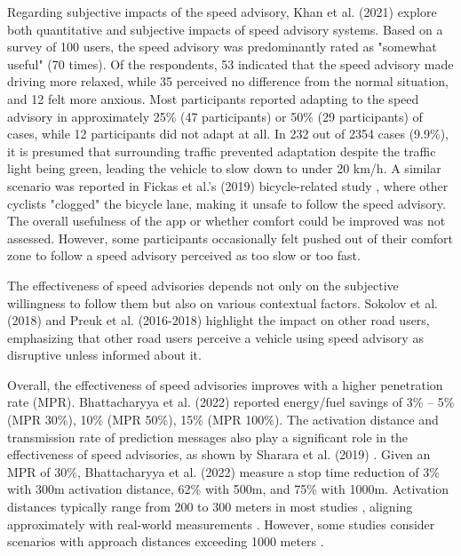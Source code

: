Regarding subjective impacts of the speed advisory, Khan et al. (2021) \cite{khan_eco-drive_2021} explore both quantitative and subjective impacts of speed advisory systems. Based on a survey of 100 users, the speed advisory was predominantly rated as "somewhat useful" (70 times). Of the respondents, 53 indicated that the speed advisory made driving more relaxed, while 35 perceived no difference from the normal situation, and 12 felt more anxious. Most participants reported adapting to the speed advisory in approximately 25\% (47 participants) or 50\% (29 participants) of cases, while 12 participants did not adapt at all. In 232 out of 2354 cases (9.9\%), it is presumed that surrounding traffic prevented adaptation despite the traffic light being green, leading the vehicle to slow down to under 20 km/h. A similar scenario was reported in Fickas et al.'s (2019) bicycle-related study \cite{fickas_fast_2019}, where other cyclists "clogged" the bicycle lane, making it unsafe to follow the speed advisory. The overall usefulness of the app or whether comfort could be improved was not assessed. However, some participants occasionally felt pushed out of their comfort zone to follow a speed advisory perceived as too slow or too fast.

The effectiveness of speed advisories depends not only on the subjective willingness to follow them but also on various contextual factors. Sokolov et al. (2018) \cite{sokolov_effects_2018} and Preuk et al. (2016-2018) \cite{preuk_does_2016, preuk_should_2018} highlight the impact on other road users, emphasizing that other road users perceive a vehicle using speed advisory as disruptive unless informed about it.

Overall, the effectiveness of speed advisories improves with a higher penetration rate (MPR). Bhattacharyya et al. (2022) \cite{bhattacharyya_assessing_2022} reported energy/fuel savings of 3\% -- 5\% (MPR 30\%), 10\% (MPR 50\%), 15\% (MPR 100\%). The activation distance and transmission rate of prediction messages also play a significant role in the effectiveness of speed advisories, as shown by Sharara et al. (2019) \cite{sharara_impact_2019}. Given an MPR of 30\%, Bhattacharyya et al. (2022) \cite{bhattacharyya_assessing_2022} measure a stop time reduction of 3\% with 300m activation distance, 62\% with 500m, and 75\% with 1000m. Activation distances typically range from 200 to 300 meters in most studies \cite{xia_indirect_2011, raubitschek_predictive_2011, rakha_eco-driving_2011, rakha_aeris_2012, mahler_reducing_2012, tal_vehicular-communications-based_2016, xu_bb_2015, de_nunzio_eco-driving_2015, luo_green_2017, kloeppel_performance_2019, dabiri_optimized_2020, hu_lane-level_2023}, aligning approximately with real-world measurements \cite{bernais_design_2016}. However, some studies consider scenarios with approach distances exceeding 1000 meters \cite{tielert_impact_2010, asadi_predictive_2011, krajzewicz_preparing_2012, nguyen_efficient_2016, karoui_efficiency_2018, plianos_predictive_2018, sharara_impact_2019, simchon_real-time_2020, bhattacharyya_assessing_2022}.

